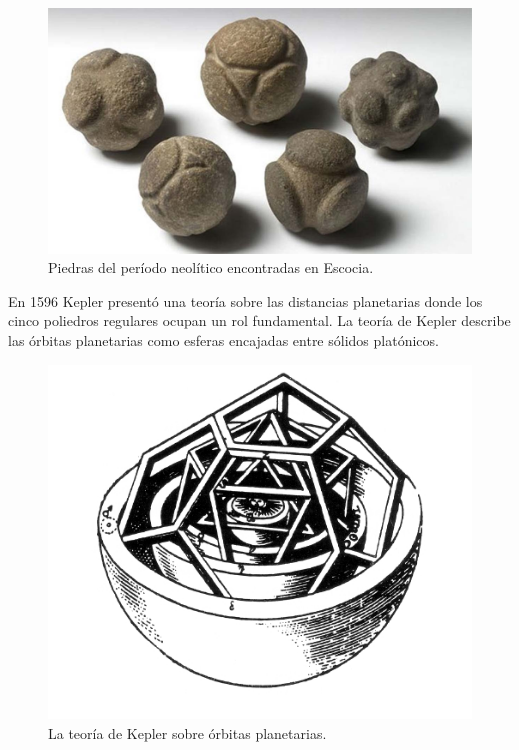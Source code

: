 \begin{figure}
   \centering
   \includegraphics[scale=0.1]{images/stones}
   \caption{Piedras del período neolítico encontradas en Escocia.}
   \label{fig:piedras}
\end{figure}



En 1596 Kepler presentó una teoría sobre las distancias planetarias donde los
cinco poliedros regulares ocupan un rol fundamental. La teoría
de Kepler describe las órbitas planetarias como esferas encajadas
entre sólidos platónicos. 

\begin{figure}
   \centering
   \includegraphics[scale=0.3]{images/kepler}
   \caption{La teoría de Kepler sobre órbitas planetarias.}
   \label{fig:kepler}
\end{figure}

